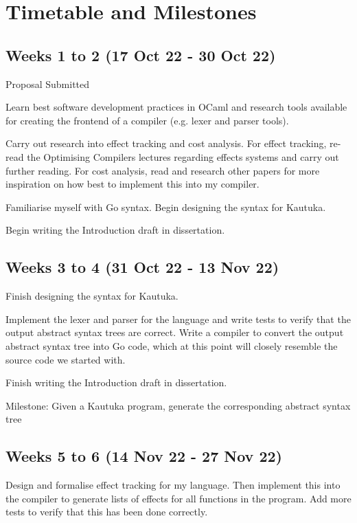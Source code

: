 \documentclass[12pt,a4paper,twoside]{article}
\begin{document}
\newpage 

\section{Timetable and Milestones}

\subsection*{Weeks 1 to 2 (17 Oct 22 - 30 Oct 22)}
Proposal Submitted

Learn best software development practices in OCaml and research tools available for creating the frontend of a compiler (e.g. lexer and parser tools). 

Carry out research into effect tracking and cost analysis. For effect tracking, re-read the Optimising Compilers lectures regarding effects systems \cite{Optimising-Compilers-Lecture-13-Effect-Systems} and carry out further reading. For cost analysis, read \cite{10.1145/361002.361016} and research other papers for more inspiration on how best to implement this into my compiler.

Familiarise myself with Go syntax. Begin designing the syntax for Kautuka.

Begin writing the Introduction draft in dissertation.

\subsection*{Weeks 3 to 4 (31 Oct 22 - 13 Nov 22)}

Finish designing the syntax for Kautuka. 

Implement the lexer and parser for the language and write tests to verify that the output abstract syntax trees are correct. Write a compiler to convert the output abstract syntax tree into Go code, which at this point will closely resemble the source code we started with. 

Finish writing the Introduction draft in dissertation.

Milestone: Given a Kautuka program, generate the corresponding abstract syntax tree 

\subsection*{Weeks 5 to 6 (14 Nov 22 - 27 Nov 22)}

Design and formalise effect tracking for my language. Then implement this into the compiler to generate lists of effects for all functions in the program. Add more tests to verify that this has been done correctly.
\end{document}
